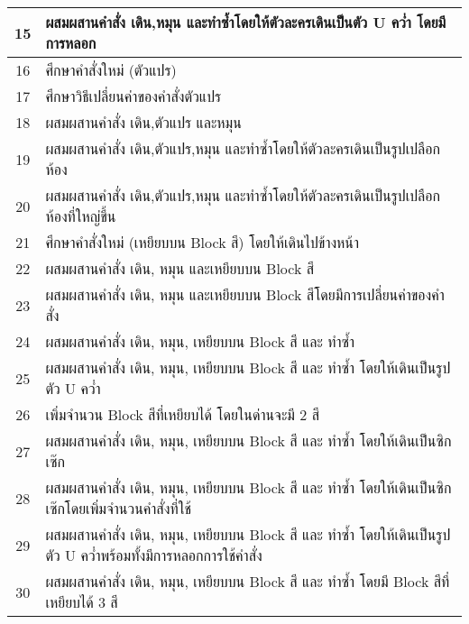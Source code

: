 \begin{center}
\begin{tabular}{|c | m{35em}|}
     \hline
     15 &  ผสมผสานคำสั่ง เดิน,หมุน และทำซ้ำโดยให้ตัวละครเดินเป็นตัว U คว่ำ โดยมีการหลอก \\ 
     \hline
     16 &  ศึกษาคำสั่งใหม่ (ตัวแปร) \\ 
     \hline
     17 &  ศึกษาวิธีเปลี่ยนค่าของคำสั่งตัวแปร \\ 
     \hline
     18 &  ผสมผสานคำสั่ง เดิน,ตัวแปร และหมุน \\ 
     \hline
     19 &  ผสมผสานคำสั่ง เดิน,ตัวแปร,หมุน และทำซ้ำโดยให้ตัวละครเดินเป็นรูปเปลือกห้อง \\ 
     \hline
     20 &  ผสมผสานคำสั่ง เดิน,ตัวแปร,หมุน และทำซ้ำโดยให้ตัวละครเดินเป็นรูปเปลือกห้องที่ใหญ่ขึ้น \\ 
     \hline
     21 &  ศึกษาคำสั่งใหม่ (เหยียบบน Block สี) โดยให้เดินไปข้างหน้า \\ 
     \hline
     22 &  ผสมผสานคำสั่ง เดิน, หมุน และเหยียบบน Block สี \\ 
     \hline
     23 &  ผสมผสานคำสั่ง เดิน, หมุน และเหยียบบน Block สีโดยมีการเปลี่ยนค่าของคำสั่ง \\ 
     \hline
     24 &  ผสมผสานคำสั่ง เดิน, หมุน, เหยียบบน Block สี และ ทำซ้ำ \\ 
     \hline
     25 &  ผสมผสานคำสั่ง เดิน, หมุน, เหยียบบน Block สี และ ทำซ้ำ โดยให้เดินเป็นรูปตัว U คว่ำ \\ 
     \hline
     26 &  เพิ่มจำนวน Block สีที่เหยียบได้ โดยในด่านจะมี 2 สี \\ 
     \hline
     27 &  ผสมผสานคำสั่ง เดิน, หมุน, เหยียบบน Block สี และ ทำซ้ำ โดยให้เดินเป็นซิกเซ๊ก \\ 
     \hline
     28 &  ผสมผสานคำสั่ง เดิน, หมุน, เหยียบบน Block สี และ ทำซ้ำ โดยให้เดินเป็นซิกเซ๊กโดยเพิ่มจำนวนคำสั่งที่ใช้ \\ 
     \hline
     29 &  ผสมผสานคำสั่ง เดิน, หมุน, เหยียบบน Block สี และ ทำซ้ำ โดยให้เดินเป็นรูปตัว U คว่ำพร้อมทั้งมีการหลอกการใช้คำสั่ง \\ 
     \hline
     30 &  ผสมผสานคำสั่ง เดิน, หมุน, เหยียบบน Block สี และ ทำซ้ำ โดยมี Block สีที่เหยียบได้ 3 สี \\ 
     \hline
    \end{tabular}
\end{center}

